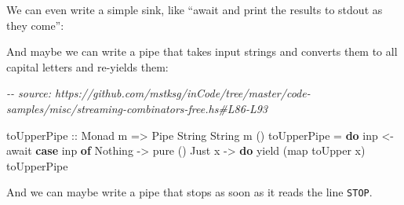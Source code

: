 \documentclass[]{article}
\newenvironment{Shaded}{}{}
\newcommand{\CommentTok}[1]{\textcolor[rgb]{0.38,0.63,0.69}{\textit{#1}}}
\newcommand{\DataTypeTok}[1]{\textcolor[rgb]{0.56,0.13,0.00}{#1}}
\newcommand{\FunctionTok}[1]{\textcolor[rgb]{0.02,0.16,0.49}{#1}}
\newcommand{\KeywordTok}[1]{\textcolor[rgb]{0.00,0.44,0.13}{\textbf{#1}}}
\newcommand{\NormalTok}[1]{#1}
\newcommand{\OperatorTok}[1]{\textcolor[rgb]{0.40,0.40,0.40}{#1}}
\newcommand{\OtherTok}[1]{\textcolor[rgb]{0.00,0.44,0.13}{#1}}
\begin{document}
We can even write a simple sink, like ``await and print the results to stdout as
they come'':

\begin{Shaded}
\end{Shaded}

And maybe we can write a pipe that takes input strings and converts them to all
capital letters and re-yields them:

\begin{Shaded}
\begin{Highlighting}[]
\CommentTok{{-}{-} source: https://github.com/mstksg/inCode/tree/master/code{-}samples/misc/streaming{-}combinators{-}free.hs\#L86{-}L93}

\OtherTok{toUpperPipe ::} \DataTypeTok{Monad}\NormalTok{ m }\OtherTok{=>} \DataTypeTok{Pipe} \DataTypeTok{String} \DataTypeTok{String}\NormalTok{ m ()}
\NormalTok{toUpperPipe }\OtherTok{=} \KeywordTok{do}
\NormalTok{    inp }\OtherTok{<{-}}\NormalTok{ await}
    \KeywordTok{case}\NormalTok{ inp }\KeywordTok{of}
      \DataTypeTok{Nothing} \OtherTok{{-}>} \FunctionTok{pure}\NormalTok{ ()}
      \DataTypeTok{Just}\NormalTok{ x  }\OtherTok{{-}>} \KeywordTok{do}
\NormalTok{        yield (}\FunctionTok{map} \FunctionTok{toUpper}\NormalTok{ x)}
\NormalTok{        toUpperPipe}
\end{Highlighting}
\end{Shaded}

And we can maybe write a pipe that stops as soon as it reads the line
\texttt{STOP}.
\end{document}
